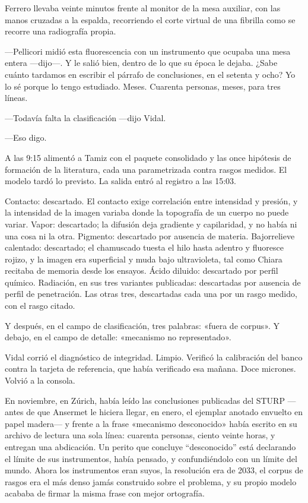 Ferrero llevaba veinte minutos frente al monitor de la mesa auxiliar, con las manos cruzadas a la espalda, recorriendo el corte virtual de una fibrilla como se recorre una radiografía propia.

---Pellicori midió esta fluorescencia con un instrumento que ocupaba una mesa entera ---dijo---. Y le salió bien, dentro de lo que su época le dejaba. ¿Sabe cuánto tardamos en escribir el párrafo de conclusiones, en el setenta y ocho? Yo lo sé porque lo tengo estudiado. Meses. Cuarenta personas, meses, para tres líneas.

---Todavía falta la clasificación ---dijo Vidal.

---Eso digo.

A las 9:15 alimentó a Tamiz con el paquete consolidado y las once hipótesis de formación de la literatura, cada una parametrizada contra rasgos medidos. El modelo tardó lo previsto. La salida entró al registro a las 15:03.

Contacto: descartado. El contacto exige correlación entre intensidad y presión, y la intensidad de la imagen variaba donde la topografía de un cuerpo no puede variar. Vapor: descartado; la difusión deja gradiente y capilaridad, y no había ni una cosa ni la otra. Pigmento: descartado por ausencia de materia. Bajorrelieve calentado: descartado; el chamuscado tuesta el hilo hasta adentro y fluoresce rojizo, y la imagen era superficial y muda bajo ultravioleta, tal como Chiara recitaba de memoria desde los ensayos. Ácido diluido: descartado por perfil químico. Radiación, en sus tres variantes publicadas: descartadas por ausencia de perfil de penetración. Las otras tres, descartadas cada una por un rasgo medido, con el rasgo citado.

Y después, en el campo de clasificación, tres palabras: «fuera de corpus». Y debajo, en el campo de detalle: «mecanismo no representado».

Vidal corrió el diagnóstico de integridad. Limpio. Verificó la calibración del banco contra la tarjeta de referencia, que había verificado esa mañana. Doce micrones. Volvió a la consola.

En noviembre, en Zúrich, había leído las conclusiones publicadas del STURP ---antes de que Ansermet le hiciera llegar, en enero, el ejemplar anotado envuelto en papel madera--- y frente a la frase «mecanismo desconocido» había escrito en su archivo de lectura una sola línea: cuarenta personas, ciento veinte horas, y entregan una abdicación. Un perito que concluye ``desconocido'' está declarando el límite de sus instrumentos, había pensado, y confundiéndolo con un límite del mundo. Ahora los instrumentos eran suyos, la resolución era de 2033, el corpus de rasgos era el más denso jamás construido sobre el problema, y su propio modelo acababa de firmar la misma frase con mejor ortografía.

